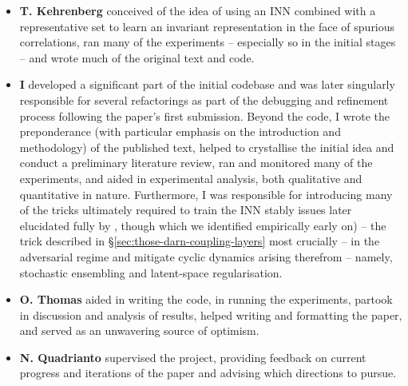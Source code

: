%
{\renewcommand\labelitemi{}
%
\begin{itemize}
    \item 
        \textbf{T. Kehrenberg} conceived of the idea of using an \ac{INN} combined with a
        representative set to learn an invariant representation in the face of spurious
        correlations, ran many of the experiments -- especially so in the initial stages -- and
        wrote much of the original text and code.
    \item 
        \textbf{I} developed a significant part of the initial codebase and was later singularly
        responsible for several refactorings as part of the debugging and refinement process
        following the paper's first submission.
        Beyond the code, I wrote the preponderance (with particular emphasis on the introduction
        and methodology) of the published text, helped to crystallise the initial idea and conduct
        a preliminary literature review, ran and monitored many of the experiments, and aided in
        experimental analysis, both qualitative and quantitative in nature.
        Furthermore, I was responsible for introducing many of the tricks ultimately required to
        train the \ac{INN} stably issues later elucidated fully by
        \citealp{behrmann2021understanding}, though which we identified empirically early on) --
        the trick described in \S\ref{sec:those-darn-coupling-layers} most crucially -- in the
        adversarial regime and mitigate cyclic dynamics arising therefrom -- namely, stochastic
        ensembling and latent-space regularisation.
    \item 
        \textbf{O. Thomas} aided in writing the code, in running the experiments, partook in
        discussion and analysis of results, helped writing and formatting the paper, and served as
        an unwavering source of optimism.
    \item
        \textbf{N. Quadrianto} supervised the project, providing feedback on current progress and
        iterations of the paper and advising which directions to pursue.
\end{itemize}
%
}
